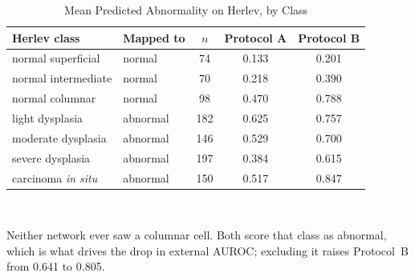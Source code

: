 \begin{table}[!htbp]
\caption{Mean Predicted Abnormality on Herlev, by Class}
\label{tab:sexternal}
\centering\footnotesize
\begin{tabular}{@{}llccc@{}}
\toprule
Herlev class & Mapped to & $n$ & Protocol A & Protocol B \\
\midrule
normal superficial & normal & 74 & 0.133 & 0.201 \\
normal intermediate & normal & 70 & 0.218 & 0.390 \\
normal columnar & normal & 98 & 0.470 & 0.788 \\
light dysplasia & abnormal & 182 & 0.625 & 0.757 \\
moderate dysplasia & abnormal & 146 & 0.529 & 0.700 \\
severe dysplasia & abnormal & 197 & 0.384 & 0.615 \\
carcinoma \emph{in situ} & abnormal & 150 & 0.517 & 0.847 \\
\bottomrule
\end{tabular}
\\[2pt]\begin{minipage}{\textwidth}\scriptsize Neither network ever saw a columnar cell. Both score that class as abnormal, which is what drives the drop in external AUROC; excluding it raises Protocol~B from 0.641 to 0.805.\end{minipage}
\end{table}
